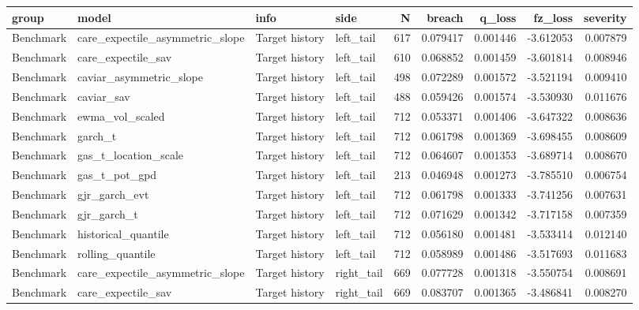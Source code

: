 \begin{tabular}{lll lrrrrr}
\toprule
group & model & info & side & N & breach & q_loss & fz_loss & severity \\
\midrule
Benchmark & care\_expectile\_asymmetric\_slope & Target history & left\_tail & 617 & 0.079417 & 0.001446 & -3.612053 & 0.007879 \\
Benchmark & care\_expectile\_sav & Target history & left\_tail & 610 & 0.068852 & 0.001459 & -3.601814 & 0.008946 \\
Benchmark & caviar\_asymmetric\_slope & Target history & left\_tail & 498 & 0.072289 & 0.001572 & -3.521194 & 0.009410 \\
Benchmark & caviar\_sav & Target history & left\_tail & 488 & 0.059426 & 0.001574 & -3.530930 & 0.011676 \\
Benchmark & ewma\_vol\_scaled & Target history & left\_tail & 712 & 0.053371 & 0.001406 & -3.647322 & 0.008636 \\
Benchmark & garch\_t & Target history & left\_tail & 712 & 0.061798 & 0.001369 & -3.698455 & 0.008609 \\
Benchmark & gas\_t\_location\_scale & Target history & left\_tail & 712 & 0.064607 & 0.001353 & -3.689714 & 0.008670 \\
Benchmark & gas\_t\_pot\_gpd & Target history & left\_tail & 213 & 0.046948 & 0.001273 & -3.785510 & 0.006754 \\
Benchmark & gjr\_garch\_evt & Target history & left\_tail & 712 & 0.061798 & 0.001333 & -3.741256 & 0.007631 \\
Benchmark & gjr\_garch\_t & Target history & left\_tail & 712 & 0.071629 & 0.001342 & -3.717158 & 0.007359 \\
Benchmark & historical\_quantile & Target history & left\_tail & 712 & 0.056180 & 0.001481 & -3.533414 & 0.012140 \\
Benchmark & rolling\_quantile & Target history & left\_tail & 712 & 0.058989 & 0.001486 & -3.517693 & 0.011683 \\
Benchmark & care\_expectile\_asymmetric\_slope & Target history & right\_tail & 669 & 0.077728 & 0.001318 & -3.550754 & 0.008691 \\
Benchmark & care\_expectile\_sav & Target history & right\_tail & 669 & 0.083707 & 0.001365 & -3.486841 & 0.008270 \\

\end{tabular}
